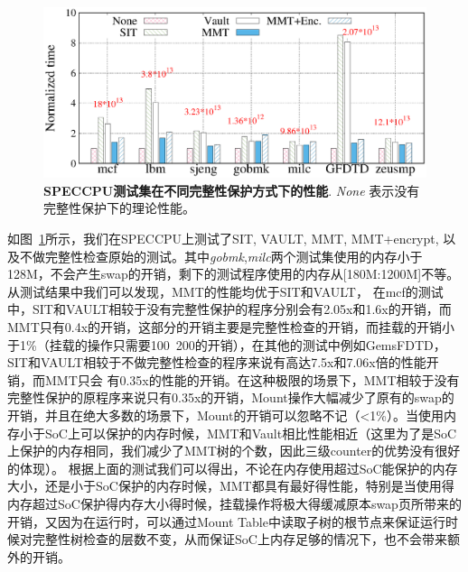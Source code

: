 \begin{figure}[hbt]
    \centering
    \setlength{\belowcaptionskip}{0pt}
    \includegraphics[scale=0.6]{fig/eval-integrity-bench.eps}
    \caption{\textbf{SPECCPU测试集在不同完整性保护方式下的性能}. \emph{None} 表示没有完整性保护下的理论性能。}
    \label{fig:eval-inter-bench}
\end{figure}
如图~\ref{fig:eval-inter-bench}所示，我们在SPECCPU上测试了SIT, VAULT, MMT, MMT+encrypt, 以及不做完整性检查原始的测试。其中\emph{gobmk},\emph{milc}两个测试集使用的内存小于128M，不会产生swap的开销，剩下的测试程序使用的内存从[180M:1200M]不等。从测试结果中我们可以发现，MMT的性能均优于SIT和VAULT，
在mcf的测试中，SIT和VAULT相较于没有完整性保护的程序分别会有2.05x和1.6x的开销，而MMT只有0.4x的开销，这部分的开销主要是完整性检查的开销，而挂载的开销小于1\%（挂载的操作只需要100~200的开销），在其他的测试中例如GemsFDTD，SIT和VAULT相较于不做完整性检查的程序来说有高达7.5x和7.06x倍的性能开销，而MMT只会
有0.35x的性能的开销。在这种极限的场景下，MMT相较于没有完整性保护的原程序来说只有0.35x的开销，Mount操作大幅减少了原有的swap的开销，并且在绝大多数的场景下，Mount的开销可以忽略不记（<1\%）。当使用内存小于SoC上可以保护的内存时候，MMT和Vault相比性能相近（这里为了是SoC上保护的内存相同，我们减少了MMT树的个数，因此三级counter的优势没有很好的体现）。
根据上面的测试我们可以得出，不论在内存使用超过SoC能保护的内存大小，还是小于SoC保护的内存时候，MMT都具有最好得性能，特别是当使用得内存超过SoC保护得内存大小得时候，挂载操作将极大得缓减原本swap页所带来的开销，又因为在运行时，可以通过Mount Table中读取子树的根节点来保证运行时候对完整性树检查的层数不变，从而保证SoC上内存足够的情况下，也不会带来额外的开销。


